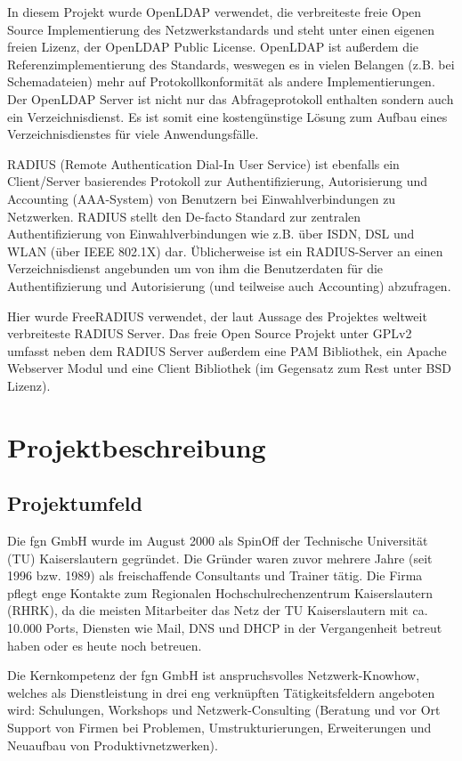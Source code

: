 \documentclass[11pt,a4paper,titlepage=firstiscover]{scrartcl} %
\begin{document}
In diesem Projekt wurde OpenLDAP verwendet, die verbreiteste freie Open Source Implementierung des Netzwerkstandards und steht unter einen eigenen freien Lizenz, der OpenLDAP Public License. OpenLDAP ist au\ss{}erdem die Referenzimplementierung des Standards, weswegen es in vielen Belangen (z.B. bei Schemadateien) mehr auf Protokollkonformität als andere Implementierungen. Der OpenLDAP Server ist nicht nur das Abfrageprotokoll enthalten sondern auch ein Verzeichnisdienst. Es ist somit eine kostengünstige Lösung zum Aufbau eines Verzeichnisdienstes für viele Anwendungsfälle.

RADIUS (Remote Authentication Dial-In User Service) ist ebenfalls ein Client/Server basierendes Protokoll zur Authentifizierung, Autorisierung und Accounting (AAA-System) von Benutzern bei Einwahlverbindungen zu Netzwerken. RADIUS stellt den De-facto Standard zur zentralen Authentifizierung von Einwahlverbindungen wie z.B. über ISDN, DSL und WLAN (über IEEE 802.1X) dar. Üblicherweise ist ein RADIUS-Server an einen Verzeichnisdienst angebunden um von ihm die Benutzerdaten für die Authentifizierung und Autorisierung (und teilweise auch Accounting) abzufragen.

Hier wurde FreeRADIUS verwendet, der laut Aussage des Projektes weltweit verbreiteste RADIUS Server. Das freie Open Source Projekt unter GPLv2 umfasst neben dem RADIUS Server au\ss{}erdem eine PAM Bibliothek, ein Apache Webserver Modul und eine Client Bibliothek (im Gegensatz zum Rest unter BSD Lizenz).

\section{Projektbeschreibung}
\subsection{Projektumfeld}
Die fgn GmbH wurde im August 2000 als SpinOff der Technische Universität (TU) Kaiserslautern gegründet. Die Gründer waren zuvor mehrere Jahre (seit 1996 bzw. 1989) als freischaffende Consultants und Trainer tätig. Die Firma pflegt enge Kontakte zum Regionalen Hochschulrechenzentrum Kaiserslautern (RHRK), da die meisten Mitarbeiter das Netz der TU Kaiserslautern mit ca. 10.000 Ports, Diensten wie Mail, DNS und DHCP in der Vergangenheit betreut haben oder es heute noch betreuen.

Die Kernkompetenz der fgn GmbH ist anspruchsvolles Netzwerk-Knowhow, welches als Dienstleistung in drei eng verknüpften Tätigkeitsfeldern angeboten wird: Schulungen, Workshops und Netzwerk-Consulting (Beratung und vor Ort Support von Firmen bei Problemen, Umstrukturierungen, Erweiterungen und Neuaufbau von Produktivnetzwerken).
\end{document}
